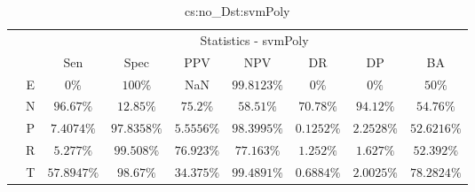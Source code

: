 \begin{table}[!ht]
	\centering
	\begin{tabular}{|c|c|c|c|c|c|c|c|c|}
		\cline{3-9}
		\multicolumn{2}{c|}{} & \multicolumn{7}{c|}{Statistics - svmPoly} \\ \cline{3-9}
		\multicolumn{2}{c|}{} & Sen & Spec & PPV & NPV & DR & DP & BA \\ \hline
		\multirow{5}{*}{\rotatebox{90}{Class}} & E & $0\%$ & $100\%$ & NaN & $99.8123\%$ & $0\%$ & $0\%$ & $50\%$ \\ \cline{2-9}
		 & N & $96.67\%$ & $12.85\%$ & $75.2\%$ & $58.51\%$ & $70.78\%$ & $94.12\%$ & $54.76\%$ \\ \cline{2-9}
		 & P & $7.4074\%$ & $97.8358\%$ & $5.5556\%$ & $98.3995\%$ & $0.1252\%$ & $2.2528\%$ & $52.6216\%$ \\ \cline{2-9}
		 & R & $5.277\%$ & $99.508\%$ & $76.923\%$ & $77.163\%$ & $1.252\%$ & $1.627\%$ & $52.392\%$ \\ \cline{2-9}
		 & T & $57.8947\%$ & $98.67\%$ & $34.375\%$ & $99.4891\%$ & $0.6884\%$ & $2.0025\%$ & $78.2824\%$ \\ \hline
	\end{tabular}
	\caption{cs:no_Dst:svmPoly}
	\label{tab:cs:no_Dst:svmPoly}
\end{table}

